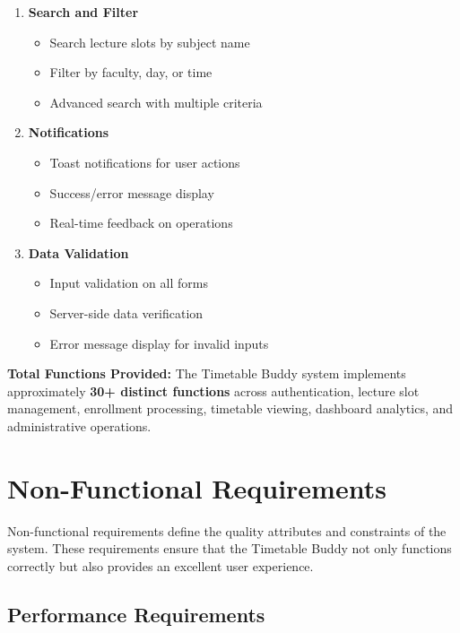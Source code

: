 \documentclass[12pt,a4paper]{report}
\begin{document}
\begin{enumerate}[leftmargin=*]
    \item \textbf{Search and Filter}
    \begin{itemize}
        \item Search lecture slots by subject name
        \item Filter by faculty, day, or time
        \item Advanced search with multiple criteria
    \end{itemize}
    
    \item \textbf{Notifications}
    \begin{itemize}
        \item Toast notifications for user actions
        \item Success/error message display
        \item Real-time feedback on operations
    \end{itemize}
    
    \item \textbf{Data Validation}
    \begin{itemize}
        \item Input validation on all forms
        \item Server-side data verification
        \item Error message display for invalid inputs
    \end{itemize}
\end{enumerate}

\textbf{Total Functions Provided:} The Timetable Buddy system implements approximately \textbf{30+ distinct functions} across authentication, lecture slot management, enrollment processing, timetable viewing, dashboard analytics, and administrative operations.

\section{Non-Functional Requirements}

Non-functional requirements define the quality attributes and constraints of the system. These requirements ensure that the Timetable Buddy not only functions correctly but also provides an excellent user experience.

\subsection{Performance Requirements}
\end{document}
